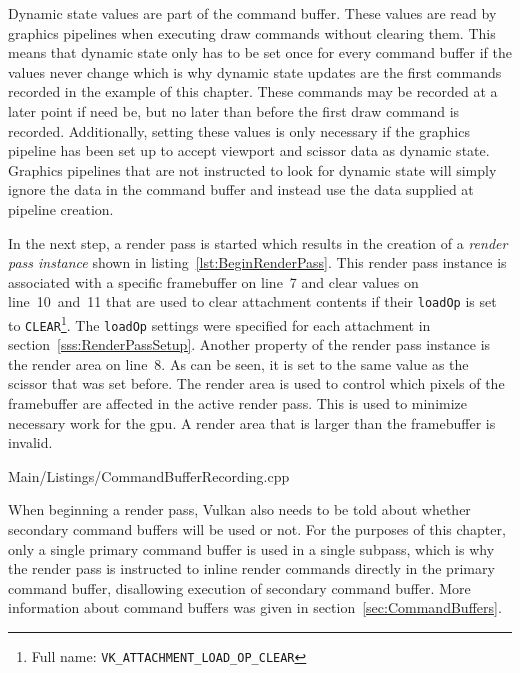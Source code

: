       Dynamic state values are part of the command buffer.
      These values are read by graphics pipelines when executing draw commands without clearing them.
      This means that dynamic state only has to be set once for every command buffer if the values never change which is why dynamic state updates are the first commands recorded in the example of this chapter.
      These commands may be recorded at a later point if need be, but no later than before the first draw command is recorded.
      Additionally, setting these values is only necessary if the graphics pipeline has been set up to accept viewport and scissor data as dynamic state.
      Graphics pipelines that are not instructed to look for dynamic state will simply ignore the data in the command buffer and instead use the data supplied at pipeline creation.

      In the next step, a render pass is started which results in the creation of a \textit{render pass instance} shown in listing~\ref{lst:BeginRenderPass}.
      This render pass instance is associated with a specific framebuffer on line~7 and clear values on line~10~and~11 that are used to clear attachment contents if their \lstinline{loadOp} is set to \lstinline{CLEAR}\footnote{Full name: \lstinline{VK_ATTACHMENT_LOAD_OP_CLEAR}}.
      The \lstinline{loadOp} settings were specified for each attachment in section~\ref{sss:RenderPassSetup}.
      Another property of the render pass instance is the render area on line~8.
      As can be seen, it is set to the same value as the scissor that was set before.
      The render area is used to control which pixels of the framebuffer are affected in the active render pass.
      This is used to minimize necessary work for the \gls{gpu}.
      A render area that is larger than the framebuffer is invalid.

      
      {Main/Listings/CommandBufferRecording.cpp}

      When beginning a render pass, Vulkan also needs to be told about whether secondary command buffers will be used or not.
      For the purposes of this chapter, only a single primary command buffer is used in a single subpass, which is why the render pass is instructed to inline render commands directly in the primary command buffer, disallowing execution of secondary command buffer.
      More information about command buffers was given in section~\ref{sec:CommandBuffers}.

